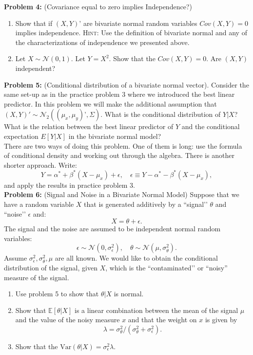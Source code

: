 \documentclass[11pt]{article} %
\begin{document}
 
 
\noindent \textbf{Problem 4:} (Covariance equal to zero implies Independence?) 

\begin{enumerate}
\item Show that if $(X,Y)’$ are bivariate normal random variables $Cov(X,Y)=0$ implies independence. {\scshape Hint:} Use the definition of bivariate normal and any of the characterizations of independence we presented above.
\item Let $X \sim \mathcal{N}(0,1)$. Let $Y=X^2$. Show that the $Cov(X,Y) = 0$. Are $(X,Y)$ independent? \end{enumerate}




\noindent \textbf{Problem 5:} (Conditional distribution of a bivariate normal vector). Consider the same set-up as in the practice problem 3 where we introduced the best linear predictor. In this problem we will make the additional assumption that $(X,Y)' \sim \mathcal{N}_2((\mu_x, \mu_y)’, \Sigma)$. What is the conditional distribution of $Y | X$? What is the relation between the best linear predictor of $Y$ and the conditional expectation $E[Y|X]$ in the bivariate normal model? \\

 There are two ways of doing this problem. One of them is long: use the formula of conditional density and working out through the algebra. There is another shorter approach. Write:
\[  Y = \alpha^* + \beta^*(X-\mu_x) + \epsilon, \quad \epsilon \equiv Y - \alpha^*-\beta^*(X-\mu_x), \]
and apply the results in practice problem 3. \\

\noindent \textbf{Problem 6:} (Signal and Noise in a Bivariate Normal Model) Suppose that we have a random variable $X$ that is generated additively by  a ``signal’’ $\theta$ and ``noise’’ $\epsilon$ and:
\[X = \theta + \epsilon.\]
The signal and the noise are assumed to be independent normal random variables:
\[ \epsilon \sim \mathcal{N}(0, \sigma^2_{\epsilon}), \quad \theta \sim \mathcal{N}(\mu, \sigma^2_{\theta}). \]
Assume $\sigma^2_{\epsilon}, \sigma^2_{\theta}, \mu$ are all known. We would like to obtain the conditional distribution of the signal, given $X$, which is the ``contaminated’’ or ``noisy” measure of the signal. 
\begin{enumerate}
\item Use problem 5 to show that $\theta | X$ is normal. \\
\item Show that $\mathbb{E}[\theta | X]$ is a linear combination between the mean of the signal $\mu$ and the value of the noisy measure $x$ and that the weight on $x$ is given by
\[\lambda = \sigma^2_{\theta} / (\sigma^2_{\theta} + \sigma^2_{\epsilon}).\]
\item Show that the $\textrm{Var}(\theta | X) = \sigma^2_{\epsilon} \lambda.$
\end{enumerate}
\end{document}
